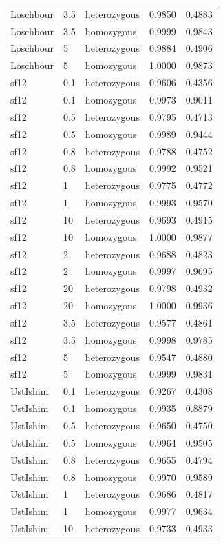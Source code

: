 {\begin{longtable}[t]{lllrr}
Loschbour & 3.5 & heterozygous & 0.9850 & 0.4883\\
Loschbour & 3.5 & homozygous & 0.9999 & 0.9843\\
Loschbour & 5 & heterozygous & 0.9884 & 0.4906\\
Loschbour & 5 & homozygous & 1.0000 & 0.9873\\
sf12 & 0.1 & heterozygous & 0.9606 & 0.4356\\
sf12 & 0.1 & homozygous & 0.9973 & 0.9011\\
sf12 & 0.5 & heterozygous & 0.9795 & 0.4713\\
sf12 & 0.5 & homozygous & 0.9989 & 0.9444\\
sf12 & 0.8 & heterozygous & 0.9788 & 0.4752\\
sf12 & 0.8 & homozygous & 0.9992 & 0.9521\\
sf12 & 1 & heterozygous & 0.9775 & 0.4772\\
sf12 & 1 & homozygous & 0.9993 & 0.9570\\
sf12 & 10 & heterozygous & 0.9693 & 0.4915\\
sf12 & 10 & homozygous & 1.0000 & 0.9877\\
sf12 & 2 & heterozygous & 0.9688 & 0.4823\\
sf12 & 2 & homozygous & 0.9997 & 0.9695\\
sf12 & 20 & heterozygous & 0.9798 & 0.4932\\
sf12 & 20 & homozygous & 1.0000 & 0.9936\\
sf12 & 3.5 & heterozygous & 0.9577 & 0.4861\\
sf12 & 3.5 & homozygous & 0.9998 & 0.9785\\
sf12 & 5 & heterozygous & 0.9547 & 0.4880\\
sf12 & 5 & homozygous & 0.9999 & 0.9831\\
UstIshim & 0.1 & heterozygous & 0.9267 & 0.4308\\
UstIshim & 0.1 & homozygous & 0.9935 & 0.8879\\
UstIshim & 0.5 & heterozygous & 0.9650 & 0.4750\\
UstIshim & 0.5 & homozygous & 0.9964 & 0.9505\\
UstIshim & 0.8 & heterozygous & 0.9655 & 0.4794\\
UstIshim & 0.8 & homozygous & 0.9970 & 0.9589\\
UstIshim & 1 & heterozygous & 0.9686 & 0.4817\\
UstIshim & 1 & homozygous & 0.9977 & 0.9634\\
UstIshim & 10 & heterozygous & 0.9733 & 0.4933\\

\end{longtable}}
